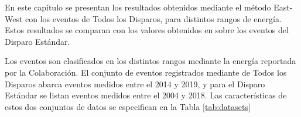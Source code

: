 

En este capítulo se presentan los resultados obtenidos mediante el método East-West con los eventos de Todos los Disparos, para  distintos rangos de energía. Estos resultados se comparan con los valores obtenidos en \cite{Aab_2020} sobre los eventos  del Disparo Estándar. 

Los eventos son clasificados en los distintos rangos mediante la energía reportada por la Colaboración. El conjunto de eventos registrados mediante de Todos los Disparos abarca eventos medidos entre el 2014 y 2019, y para el Disparo Estándar se listan eventos medidos entre el 2004 y 2018. Las características de estos dos conjuntos de datos se especifican en la Tabla \ref{tab:datasets}

